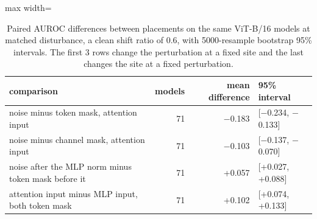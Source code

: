 \begin{table}[htbp]
\centering
\small
\caption{Paired AUROC differences between placements on the same ViT-B/16 models at matched disturbance, a clean shift ratio of 0.6, with 5000-resample bootstrap 95\% intervals. The first 3 rows change the perturbation at a fixed site and the last changes the site at a fixed perturbation.}
\label{tab:operators-deltas}
\begin{adjustbox}{max width=\linewidth}
\begin{tabular}{lrrl}
\toprule
comparison & models & mean difference & 95\% interval \\
\midrule
noise minus token mask, attention input & 71 & $-$0.183 & [$-$0.234, $-$0.133] \\
noise minus channel mask, attention input & 71 & $-$0.103 & [$-$0.137, $-$0.070] \\
noise after the MLP norm minus token mask before it & 71 & +0.057 & [+0.027, +0.088] \\
attention input minus MLP input, both token mask & 71 & +0.102 & [+0.074, +0.133] \\
\bottomrule
\end{tabular}
\end{adjustbox}
\end{table}
